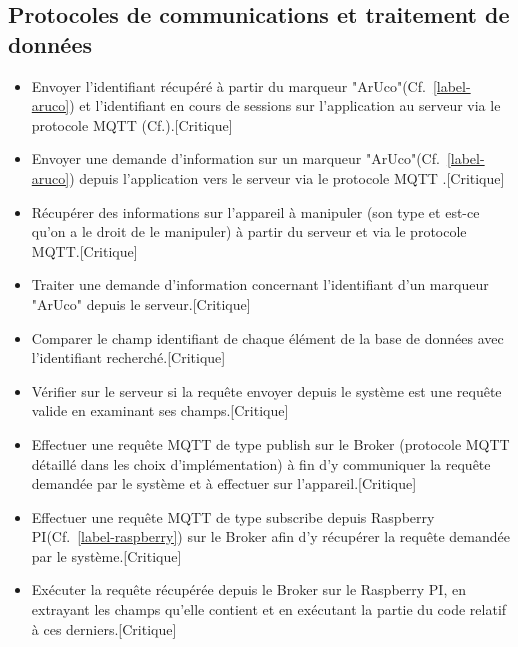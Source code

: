 \documentclass[12pt,a4paper]{article}
\begin{document}
\subsection{Protocoles de communications et traitement de données}
\begin{itemize}
\item Envoyer l'identifiant récupéré à partir du marqueur "ArUco"(Cf.~\ref{label-aruco}) et l'identifiant en cours de sessions sur l'application au serveur via le protocole MQTT (Cf.\cite{Ref21}).[Critique]
\item Envoyer une demande d'information sur un marqueur "ArUco"(Cf.~\ref{label-aruco}) depuis l'application vers le serveur via le protocole MQTT .[Critique]
\item Récupérer des informations sur l'appareil à manipuler (son type et est-ce qu'on a le droit de le manipuler) à partir du serveur et via le protocole MQTT.[Critique]
\item Traiter une demande d'information concernant l'identifiant d'un marqueur "ArUco" depuis le serveur.[Critique]
\item Comparer le champ identifiant de chaque élément de la base de données avec l'identifiant recherché.[Critique]
\item Vérifier sur le serveur si la requête envoyer depuis le système est une requête valide en examinant ses champs.[Critique]
\item Effectuer une requête MQTT de type publish sur le Broker (protocole MQTT détaillé dans les choix d'implémentation) à fin d'y communiquer la requête demandée par le système et à effectuer sur l'appareil.[Critique]
\item Effectuer une requête MQTT de type subscribe depuis Raspberry PI(Cf.~\ref{label-raspberry}) sur le Broker afin d'y récupérer la requête demandée par le système.[Critique]
\item Exécuter la requête récupérée depuis le Broker sur le Raspberry PI, en extrayant les champs qu'elle contient et en exécutant la partie du code relatif à ces derniers.[Critique]
\end{itemize}
\end{document}
